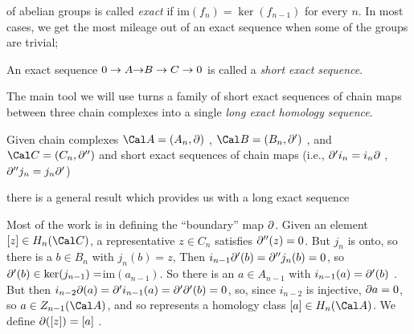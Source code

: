 of abelian groups is called {\it exact} if im$(f_n)=\ker(f_{n-1})$ 
for every $n$. In most cases,
we get the most mileage out of an exact sequence when some of the groups
are trivial; 

\ssk


\ssk
 
An exact sequence $0\rightarrow A {\rightarrow}B\rightarrow C\rightarrow 0$ is called a {\it short exact sequence}.

\bsk

The main tool we will use turns a family of short exact sequences of chain maps
between three chain complexes into a single {\it long exact homology sequence}.

\ssk

Given chain complexes ${\Cal A}=(A_n,\del)$ , 
${\Cal B}=(B_n,\del^\prime)$ , and ${\Cal C}=(C_n,\del^{\prime\prime})$
and short exact sequences of chain maps (i.e., 
$\partial^\prime i_n  = i_n\partial $ , $\partial^{\prime\prime}j_n = j_n\partial^\prime $)

\ssk


\ssk

there is a general result which provides us with a long exact sequence

\ssk


\ssk

Most of the work is in defining the ``boundary'' map $\partial$. Given an 
element $[z]\in H_n({\Cal C})$, a representative $z\in C_n$ satisfies 
$\partial^{\prime\prime}(z)=0$. But $j_n$ is onto, so there is a $b\in B_n$ with
$j_n(b)=z$, Then $ i_{n-1}\partial^\prime(b) = \partial^{\prime\prime}j_n(b)
=0$, so $\partial^\prime(b)\in\ker(j_{n-1})=$im$(a_{n-1})$. So there is an $a\in A_{n-1}$
with $i_{n-1}(a)=\partial^\prime(b)$ . But then 
$i_{n-2}\partial (a) = \partial^\prime i_{n-1}(a)=\partial^\prime\partial^\prime(b)=0$,
so, since $i_{n-2}$ is injective, $\partial a=0$, so $a\in Z_{n-1}({\Cal A})$, and
so represents a homology class $[a]\in H_n({\Cal A})$. We define
$\partial([z])=[a]$ . 

\vfill
\eject


